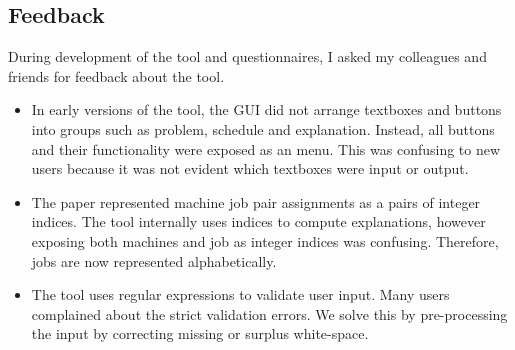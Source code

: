 \subsection{Feedback}

During development of the tool and questionnaires, I asked my colleagues and friends for feedback about the tool.

\begin{itemize}
	\item In early versions of the tool, the GUI did not arrange textboxes and buttons into groups such as problem, schedule and explanation. Instead, all buttons and their functionality were exposed as an menu. This was confusing to new users because it was not evident which textboxes were input or output.
	\item The paper \cite{aes} represented machine job pair assignments as a pairs of integer indices. The tool internally uses indices to compute explanations, however exposing both machines and job as integer indices was confusing. Therefore, jobs are now represented alphabetically.
	\item The tool uses regular expressions to validate user input. Many users complained about the strict validation errors. We solve this by pre-processing the input by correcting missing or surplus white-space.
\end{itemize}